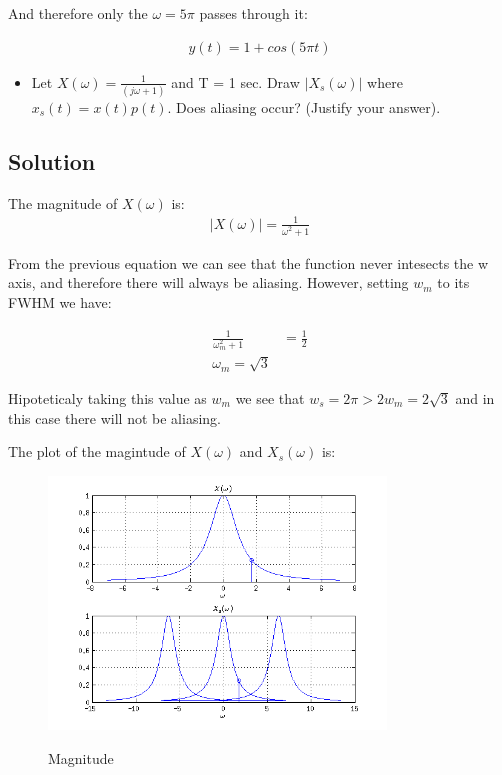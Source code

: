 And therefore only the $\omega = 5 \pi$ passes through it:

\begin{equation*}
\begin{aligned}
y(t) = 1 + cos(5 \pi t)
\end{aligned}
\end{equation*} 

\begin{itemize}
\item Let $X(\omega) = \frac{1}{(j\omega+1)}$ and T = 1 sec.
Draw $|X_s(\omega)|$ where $x_s(t) = x(t)p(t)$. 
Does aliasing occur? (Justify your answer).
\end{itemize} 

\subsection*{Solution}

The magnitude of $X(\omega)$ is:
\begin{equation*}
\begin{aligned}
|X(\omega)| = \frac{1}{\omega^2 + 1}
\end{aligned}
\end{equation*} 

From the previous equation we can see that the function never intesects the w axis,
and therefore there will always be aliasing. 
However, setting $w_m$ to its FWHM we have:

\begin{equation*}
\begin{aligned}
\frac{1}{\omega_m^2+1} &= \frac{1}{2} \\
\omega_m = \sqrt{3}
\end{aligned}
\end{equation*} 

Hipoteticaly taking this value as $w_m$ we see that 
$w_s = 2 \pi > 2 w_m = 2 \sqrt{3} $ and in this case there will
not be aliasing.

The plot of the magintude of $X(\omega)$ and $X_s(\omega)$ is:

\begin{figure}[H]
\caption{Magnitude}
\centering
\includegraphics[width=0.8\textwidth]{figs/c3p6b2.png}
\label{fig:c3p6b2}
\end{figure} 

